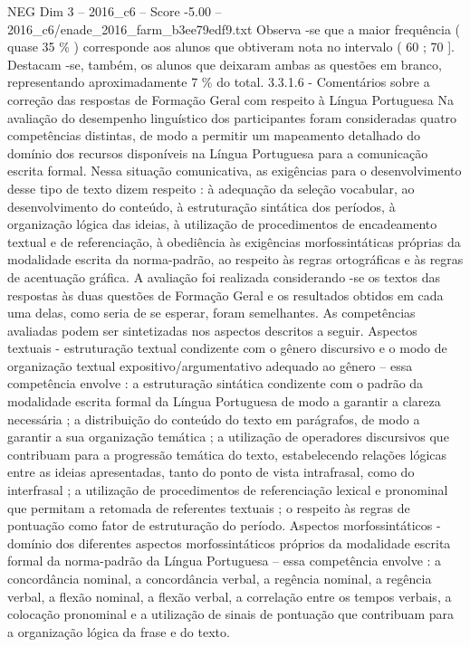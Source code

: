 \begin{textsample}{NEG Dim 3 – 2016\_c6 – Score -5.00 – 2016\_c6/enade\_2016\_farm\_b3ee79edf9.txt}
Observa -se que a maior frequência ( quase 35 \% ) corresponde aos alunos que obtiveram nota no intervalo ( 60 ; 70 ].
Destacam -se, também, os alunos que deixaram ambas as questões em branco, representando aproximadamente 7 \% do total. 3.3.1.6 - Comentários sobre a correção das respostas de Formação Geral com respeito à Língua Portuguesa Na avaliação do desempenho linguístico dos participantes foram consideradas quatro competências distintas, de modo a permitir um mapeamento detalhado do domínio dos recursos disponíveis na Língua Portuguesa para a comunicação escrita formal.
Nessa situação comunicativa, as exigências para o desenvolvimento desse tipo de texto dizem respeito : à adequação da seleção vocabular, ao desenvolvimento do conteúdo, à estruturação sintática dos períodos, à organização lógica das ideias, à utilização de procedimentos de encadeamento textual e de referenciação, à obediência às exigências morfossintáticas próprias da modalidade escrita da norma-padrão, ao respeito às regras ortográficas e às regras de acentuação gráfica.
A avaliação foi realizada considerando -se os textos das respostas às duas questões de Formação Geral e os resultados obtidos em cada uma delas, como seria de se esperar, foram semelhantes.
As competências avaliadas podem ser sintetizadas nos aspectos descritos a seguir.
Aspectos textuais - estruturação textual condizente com o gênero discursivo e o modo de organização textual expositivo/argumentativo adequado ao gênero – essa competência envolve : a estruturação sintática condizente com o padrão da modalidade escrita formal da Língua Portuguesa de modo a garantir a clareza necessária ; a distribuição do conteúdo do texto em parágrafos, de modo a garantir a sua organização temática ; a utilização de operadores discursivos que contribuam para a progressão temática do texto, estabelecendo relações lógicas entre as ideias apresentadas, tanto do ponto de vista intrafrasal, como do interfrasal ; a utilização de procedimentos de referenciação lexical e pronominal que permitam a retomada de referentes textuais ; o respeito às regras de pontuação como fator de estruturação do período.
Aspectos morfossintáticos - domínio dos diferentes aspectos morfossintáticos próprios da modalidade escrita formal da norma-padrão da Língua Portuguesa – essa competência envolve : a concordância nominal, a concordância verbal, a regência nominal, a regência verbal, a flexão nominal, a flexão verbal, a correlação entre os tempos verbais, a colocação pronominal e a utilização de sinais de pontuação que contribuam para a organização lógica da frase e do texto.

\end{textsample}
